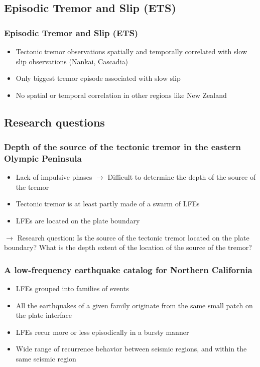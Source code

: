 \documentclass{beamer}
\begin{document}
	\subsection{Episodic Tremor and Slip (ETS)}

	\begin{frame}
		\frametitle{Episodic Tremor and Slip (ETS)}
		\begin{itemize}
			\item Tectonic tremor observations spatially and temporally correlated with slow slip observations (Nankai, Cascadia)
			\item Only biggest tremor episode associated with slow slip
			\item No spatial or temporal correlation in other regions like New Zealand
		\end{itemize}
	\end{frame}

	
	\subsection{Research questions}

	\begin{frame}
		\frametitle{Depth of the source of the tectonic tremor in the eastern Olympic Peninsula}
		\begin{itemize}
			\item Lack of impulsive phases $\rightarrow$ Difficult to determine the depth of the source of the tremor
			\item Tectonic tremor is at least partly made of a swarm of LFEs
			\item LFEs are located on the plate boundary
		\end{itemize}

		\begin{block}{}
			$\rightarrow$ Research question: Is the source of the tectonic tremor located on the plate boundary? What is the depth extent of the location of the source of the tremor?
		\end{block}
	\end{frame}

	\begin{frame}
		\frametitle{A low-frequency earthquake catalog for Northern California}
		\begin{itemize}
			\item LFEs grouped into families of events
			\item All the earthquakes of a given family originate from the same small patch on the plate interface
			\item LFEs recur more or less episodically in a bursty manner
			\item Wide range of recurrence behavior between seismic regions, and within the same seismic region
		\end{itemize}
	\end{frame}
\end{document}
